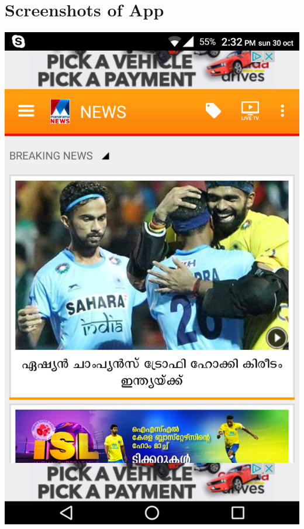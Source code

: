 \documentclass[a4paper, 11pt]{article}
\begin{document}
\section*{Screenshots of App} 
\includegraphics[scale=0.15]{sa.png}
\end{document}

